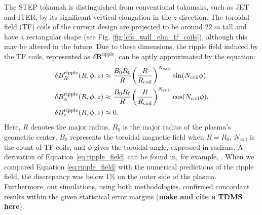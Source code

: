 \documentclass[10pt, a4paper, twoside]{article}
\begin{document}
The STEP tokamak is distinguished from conventional tokamaks, such as JET and ITER, by its significant vertical elongation in the $z$-direction. The toroidal field (TF) coils of the current design are projected to be around $\si{22.m}$ tall and have a rectangular shape (see Fig. \ref{fig:lcfs_wall_elm_tf_coils}), although this may be altered in the future. Due to these dimensions, the ripple field induced by the TF coils, represented as $\delta\mathbf{B}^\text{ripple}$, can be aptly approximated by the equation:
\begin{equation}
    \label{eq:ripple_field}
    \begin{aligned}
        \delta B_R^{\text{ripple}}(R, \phi, z) &\approx \frac{B_0 R_0}{R} \qty(\frac{R}{R_{\text{coil}}})^{N_{coil}}\sin(N_{\text{coil}}\phi), \\
        \delta B_\phi^{\text{ripple}}(R, \phi, z) &\approx \frac{B_0 R_0}{R} \qty(\frac{R}{R_{\text{coil}}})^{N_{coil}}\cos(N_{\text{coil}}\phi),\\
        \delta B_z^{\text{ripple}}(R, \phi, z) &\approx 0.
    \end{aligned}
\end{equation}
Here, $R$ denotes the major radius, $R_0$ is the major radius of the plasma's geometric center, $B_0$ represents the toroidal magnetic field when $R=R_0$, $N_{\text{coil}}$ is the count of TF coils, and $\phi$ gives the toroidal angle, expressed in radians. A derivation of Equation \eqref{eq:ripple_field} can be found in, for example, \cite{mcclements2005}.  When we compared Equation \eqref{eq:ripple_field} with the numerical predictions of the ripple field, the discrepancy was below 1\% on the outer side of the plasma. Furthermore, our simulations, using both methodologies, confirmed concordant results within the given statistical error margins (\textbf{make and cite a TDMS here}).
\end{document}
